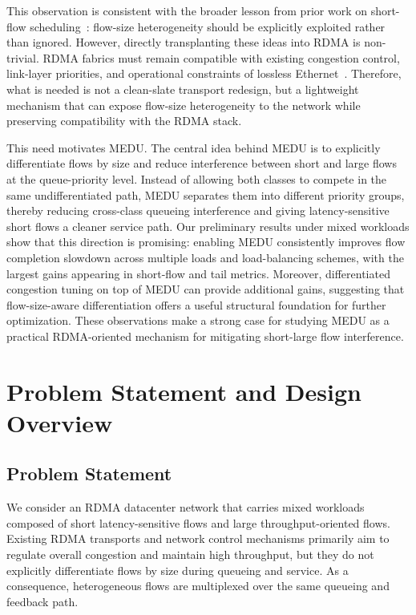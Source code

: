 \documentclass[conference]{IEEEtran}
\begin{document}
This observation is consistent with the broader lesson from prior work on short-flow scheduling~\cite{pfabric,pias,homa}: flow-size heterogeneity should be explicitly exploited rather than ignored. However, directly transplanting these ideas into RDMA is non-trivial. RDMA fabrics must remain compatible with existing congestion control, link-layer priorities, and operational constraints of lossless Ethernet~\cite{dcqcn,timely,hpcc,revisiting-rdma}. Therefore, what is needed is not a clean-slate transport redesign, but a lightweight mechanism that can expose flow-size heterogeneity to the network while preserving compatibility with the RDMA stack.

This need motivates MEDU. The central idea behind MEDU is to explicitly differentiate flows by size and reduce interference between short and large flows at the queue-priority level. Instead of allowing both classes to compete in the same undifferentiated path, MEDU separates them into different priority groups, thereby reducing cross-class queueing interference and giving latency-sensitive short flows a cleaner service path. Our preliminary results under mixed workloads show that this direction is promising: enabling MEDU consistently improves flow completion slowdown across multiple loads and load-balancing schemes, with the largest gains appearing in short-flow and tail metrics. Moreover, differentiated congestion tuning on top of MEDU can provide additional gains, suggesting that flow-size-aware differentiation offers a useful structural foundation for further optimization. These observations make a strong case for studying MEDU as a practical RDMA-oriented mechanism for mitigating short-large flow interference.

\section{Problem Statement and Design Overview}

\subsection{Problem Statement}

We consider an RDMA datacenter network that carries mixed workloads composed of short latency-sensitive flows and large throughput-oriented flows. Existing RDMA transports and network control mechanisms primarily aim to regulate overall congestion and maintain high throughput, but they do not explicitly differentiate flows by size during queueing and service. As a consequence, heterogeneous flows are multiplexed over the same queueing and feedback path.
\end{document}
